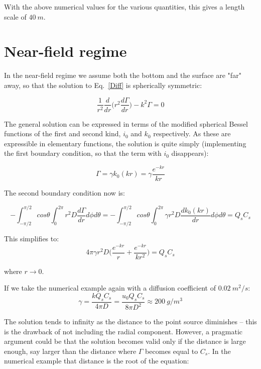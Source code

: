 \documentclass[onecolumn]{article}
\begin{document}
With the above numerical values for the various quantities, this gives a length scale of \(40~m\).


\section*{Near-field regime}
In the near-field regime we assume both the bottom and the surface are "far" away, so that the solution to Eq.\ \ref{Diff} is
spherically symmetric:

\begin{equation}
\frac{1}{r^2}\frac{d}{dr} \bigl ( r^2 \frac{d \Gamma}{dr} \bigr ) - k^2 \Gamma = 0
\end{equation}

The general solution can be expressed in terms of the modified spherical Bessel functions of the first
and second kind, \(i_0\) and \(k_0\) respectively. As these are expressible in elementary functions,
the solution is quite simply (implementing the first boundary condition, so that the term with \(i_0\)
disappears):

\begin{equation}
\Gamma = \gamma k_0(kr) = \gamma \frac{e^{-kr}}{kr}
\end{equation}

The second boundary condition now is:

\begin{equation}
- \int_{-\pi/2}^{\pi/2} cos \theta \int_0^{2 \pi} r^2 D \frac{d \Gamma}{d r} d \phi d \theta = - \int_{-\pi/2}^{\pi/2} cos \theta \int_0^{2 \pi} \gamma r^2 D \frac{d k_0(kr)}{d r} d \phi d \theta = Q_s C_s
\end{equation}

This simplifies to:
\begin{equation}
4 \pi  \gamma r^2 D \bigl ( \frac{e^{-kr}}{r} + \frac{e^{-kr}}{kr^2} \bigr ) = Q_s C_s
\end{equation}

\noindent where \(r \rightarrow 0\).

If we take the numerical example again with a diffusion coefficient of \(0.02~m^2/s\):
\begin{equation}
\gamma = \frac{k Q_s C_s}{4 \pi D} = \frac{u_0 Q_s C_s}{8 \pi D^2} \approx 200~g/m^3
\end{equation}

The solution tends to infinity as the distance to the point source diminishes -- this is
the drawback of not including the radial component. However, a pragmatic argument could be that
the solution becomes valid only if the distance is large enough, say larger than the distance
where \(\Gamma\) becomes equal to \(C_s\). In the numerical example that distance is the root of
the equation:
\end{document}
